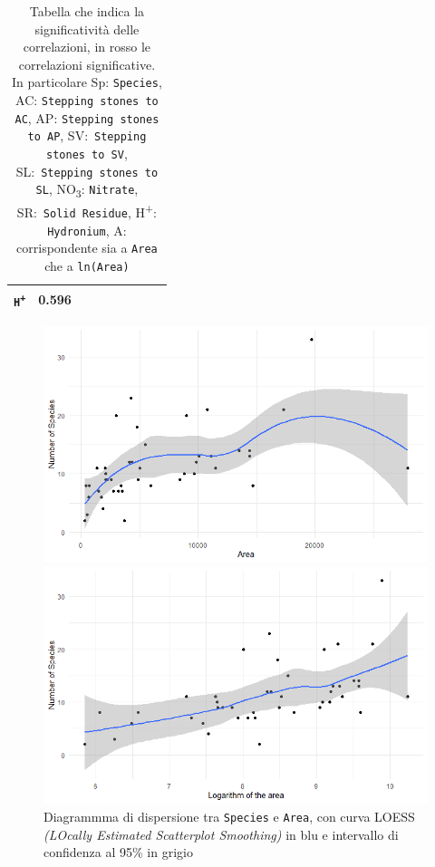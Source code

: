 \documentclass{article} %
\begin{document}
\begin{table}[H]
\begin{tabular}{lcccccccc}
            \texttt{H\textsuperscript{+}} & 0.596 &  &  &  &  &  & & \\
        \bottomrule
    \end{tabular}
    \caption{Tabella che indica la significatività delle correlazioni, in rosso le correlazioni significative.\\
    In particolare Sp: \texttt{Species}, AC: \texttt{Stepping stones to AC}, AP: \texttt{Stepping stones to AP}, SV:\ \texttt{Stepping stones to SV}, SL:\ \texttt{Stepping stones to SL}, NO\textsubscript{3}: \texttt{Nitrate}, SR:\ \texttt{Solid Residue}, H\textsuperscript{+}: \texttt{Hydronium}, A: corrispondente sia a \texttt{Area} che a \texttt{ln(Area)}}
\end{table}

\begin{figure}[H]
    \centering
    \begin{minipage}{0.49\textwidth}
        \centering
        \includegraphics[width=\textwidth]{immagini/sp_a.png}
        \captionsetup{justification=centering}
        \caption{Diagrammma di dispersione tra \texttt{Species} e \texttt{Area}, con curva LOESS \textit{(LOcally Estimated Scatterplot Smoothing)} in blu e intervallo di confidenza al 95\% in grigio}
    \end{minipage}
    \hfill
    \begin{minipage}{0.49\textwidth}
        \centering
        \includegraphics[width=\textwidth]{immagini/sp_ln.png}

\end{minipage}
\end{figure}
\end{document}
